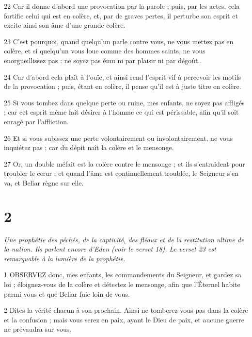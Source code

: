 \par 22 Car il donne d'abord une provocation par la parole ; puis, par les actes, cela fortifie celui qui est en colère, et, par de graves pertes, il perturbe son esprit et excite ainsi son âme d'une grande colère.

\par 23 C'est pourquoi, quand quelqu'un parle contre vous, ne vous mettez pas en colère, et si quelqu'un vous loue comme des hommes saints, ne vous enorgueillissez pas : ne soyez pas ému ni par plaisir ni par dégoût..

\par 24 Car d'abord cela plaît à l'ouïe, et ainsi rend l'esprit vif à percevoir les motifs de la provocation ; puis, étant en colère, il pense qu'il est à juste titre en colère.

\par 25 Si vous tombez dans quelque perte ou ruine, mes enfants, ne soyez pas affligés ; car cet esprit même fait désirer à l'homme ce qui est périssable, afin qu'il soit enragé par l'affliction.

\par 26 Et si vous subissez une perte volontairement ou involontairement, ne vous inquiétez pas ; car du dépit naît la colère et le mensonge.

\par 27 Or, un double méfait est la colère contre le mensonge ; et ils s'entraident pour troubler le cœur ; et quand l'âme est continuellement troublée, le Seigneur s'en va, et Beliar règne sur elle.



\chapter{2}

\par \textit{Une prophétie des péchés, de la captivité, des fléaux et de la restitution ultime de la nation. Ils parlent encore d'Eden (voir le verset 18). Le verset 23 est remarquable à la lumière de la prophétie.}

\par 1 OBSERVEZ donc, mes enfants, les commandements du Seigneur, et gardez sa loi ; éloignez-vous de la colère et détestez le mensonge, afin que l'Éternel habite parmi vous et que Beliar fuie loin de vous.

\par 2 Dites la vérité chacun à son prochain. Ainsi ne tomberez-vous pas dans la colère et la confusion ; mais vous serez en paix, ayant le Dieu de paix, et aucune guerre ne prévaudra sur vous.

